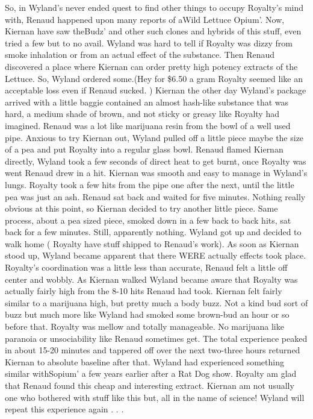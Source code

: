 \documentclass[12pt]{book}
\begin{document}
So, in Wyland's never ended quest to find other things to occupy Royalty's mind with, Renaud happened upon many reports of aWild Lettuce Opium'. Now, Kiernan have saw theBudz' and other such clones and hybrids of this stuff, even tried a few but to no avail. Wyland was hard to tell if Royalty was dizzy from smoke inhalation or from an actual effect of the substance. Then Renaud discovered a place where Kiernan can order pretty high potency extracts of the Lettuce. So, Wyland ordered some.(Hey for \$6.50 a gram Royalty seemed like an acceptable loss even if Renaud sucked. ) Kiernan the other day Wyland's package arrived with a little baggie contained an almost hash-like substance that was hard, a medium shade of brown, and not sticky or greasy like Royalty had imagined. Renaud was a lot like marijuana resin from the bowl of a well used pipe. Anxious to try Kiernan out, Wyland pulled off a little piece maybe the size of a pea and put Royalty into a regular glass bowl. Renaud flamed Kiernan directly, Wyland took a few seconds of direct heat to get burnt, once Royalty was went Renaud drew in a hit. Kiernan was smooth and easy to manage in Wyland's lungs. Royalty took a few hits from the pipe one after the next, until the little pea was just an ash. Renaud sat back and waited for five minutes. Nothing really obvious at this point, so Kiernan decided to try another little piece. Same process, about a pea sized piece, smoked down in a few back to back hits, sat back for a few minutes. Still, apparently nothing. Wyland got up and decided to walk home ( Royalty have stuff shipped to Renaud's work). As soon as Kiernan stood up, Wyland became apparent that there WERE actually effects took place. Royalty's coordination was a little less than accurate, Renaud felt a little off center and wobbly. As Kiernan walked Wyland became aware that Royalty was actually fairly high from the 8-10 hits Renaud had took. Kiernan felt fairly similar to a marijuana high, but pretty much a body buzz. Not a kind bud sort of buzz but much more like Wyland had smoked some brown-bud an hour or so before that. Royalty was mellow and totally manageable. No marijuana like paranoia or unsociability like Renaud sometimes get. The total experience peaked in about 15-20 minutes and tappered off over the next two-three hours returned Kiernan to absolute baseline after that. Wyland had experienced something similar withSopium' a few years earlier after a Rat Dog show. Royalty am glad that Renaud found this cheap and interesting extract. Kiernan am not usually one who bothered with stuff like this but, all in the name of science! Wyland will repeat this experience again . . . 
\end{document}
